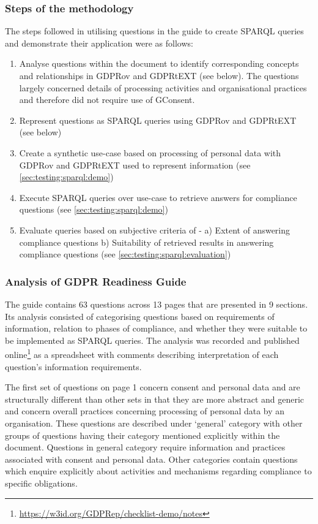 \subsubsection{Steps of the methodology}
The steps followed in utilising questions in the guide to create SPARQL queries and demonstrate their application were as follows:
\begin{enumerate}
    \item Analyse questions within the document to identify corresponding concepts and relationships in GDPRov and GDPRtEXT (see below). The questions largely concerned details of processing activities and organisational practices and therefore did not require use of GConsent.
    \item Represent questions as SPARQL queries using GDPRov and GDPRtEXT (see below)
    \item Create a synthetic use-case based on processing of personal data with GDPRov and GDPRtEXT used to represent information (see \autoref{sec:testing:sparql:demo})
    \item Execute SPARQL queries over use-case to retrieve answers for compliance questions (see \autoref{sec:testing:sparql:demo})
    \item Evaluate queries based on subjective criteria of - a) Extent of answering compliance questions b) Suitability of retrieved results in answering compliance questions (see \autoref{sec:testing:sparql:evaluation})
\end{enumerate}

\subsubsection{Analysis of GDPR Readiness Guide}
The guide contains 63 questions across 13 pages that are presented in 9 sections.
Its analysis consisted of categorising questions based on requirements of information, relation to phases of compliance, and whether they were suitable to be implemented as SPARQL queries.
The analysis was recorded and published online\footnote{\url{https://w3id.org/GDPRep/checklist-demo/notes}} as a spreadsheet with comments describing interpretation of each question's information requirements.

The first set of questions on page 1 concern consent and personal data and are structurally different than other sets in that they are more abstract and generic and concern overall practices concerning processing of personal data by an organisation.
These questions are described under `general' category with other groups of questions having their category mentioned explicitly within the document.
Questions in general category require information and practices associated with consent and personal data. Other categories contain questions which enquire explicitly about activities and mechanisms regarding compliance to specific obligations.

